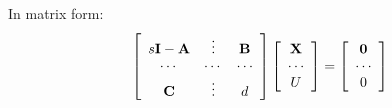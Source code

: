 In matrix form:
\[
\left[ {\begin{array}{*{20}c}
   {s{\bf{I}} - {\bf{A}}} &  \vdots  & {\bf{B}}  \\
    \cdots  &  \cdots  &  \cdots   \\
   {\bf{C}} &  \vdots  & d  \\
\end{array}} \right]\left[ {\begin{array}{*{20}c}
   {\bf{X}}  \\
    \cdots   \\
   U  \\
\end{array}} \right] = \left[ {\begin{array}{*{20}c}
   {\bf{0}}  \\
    \cdots   \\
   0  \\
\end{array}} \right]
\]


\endinput
